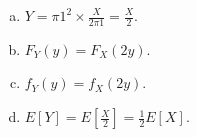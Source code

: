 \begin{pr}$ $
\begin{enumerate}[(a)]
\item $Y=\pi1^2\times\frac X{2\pi1}=\frac X2$.
\item $F_Y(y)=F_X(2y)$.
\item $f_Y(y)=f_X(2y)$.
\item $E[Y]=E[\frac X2]=\frac12E[X]$.
\end{enumerate}
\end{pr}
